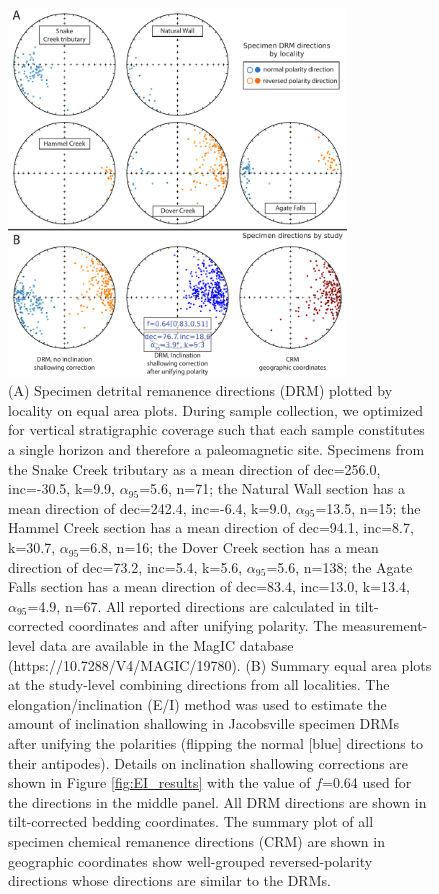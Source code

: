 \documentclass[draft]{agujournal2019}
\begin{document}
\begin{figure}[h!]
\centering
\includegraphics[width=0.8\textwidth]{in_situ_pmag.pdf}
\caption{\footnotesize (A) Specimen detrital remanence directions (DRM) plotted by locality on equal area plots. During sample collection, we optimized for vertical stratigraphic coverage such that each sample constitutes a single horizon and therefore a paleomagnetic site. Specimens from the Snake Creek tributary as a mean direction of dec=256.0\textdegree, inc=-30.5\textdegree, k=9.9, $\alpha_{95}$=5.6\textdegree, n=71; the Natural Wall section has a mean direction of dec=242.4\textdegree, inc=-6.4\textdegree, k=9.0, $\alpha_{95}$=13.5\textdegree, n=15; the Hammel Creek section has a mean direction of dec=94.1\textdegree, inc=8.7\textdegree, k=30.7, $\alpha_{95}$=6.8\textdegree, n=16; the Dover Creek section has a mean direction of dec=73.2\textdegree, inc=5.4\textdegree, k=5.6, $\alpha_{95}$=5.6\textdegree, n=138; the Agate Falls section has a mean direction of dec=83.4\textdegree, inc=13.0\textdegree, k=13.4, $\alpha_{95}$=4.9\textdegree, n=67. All reported directions are calculated in tilt-corrected coordinates and after unifying polarity. The measurement-level data are available in the MagIC database (https://10.7288/V4/MAGIC/19780). (B) Summary equal area plots at the study-level combining directions from all localities. The elongation/inclination (E/I) method \cite{Tauxe2004b} was used to estimate the amount of inclination shallowing in Jacobsville specimen DRMs after unifying the polarities (flipping the normal [blue] directions to their antipodes). Details on inclination shallowing corrections are shown in Figure \ref{fig:EI_results} with the value of $f$=0.64 used for the directions in the middle panel. All DRM directions are shown in tilt-corrected bedding coordinates. The summary plot of all specimen chemical remanence directions (CRM) are shown in geographic coordinates show well-grouped reversed-polarity directions whose directions are similar to the DRMs. }
\label{fig:in_situ_pmag}
\end{figure}
\end{document}
